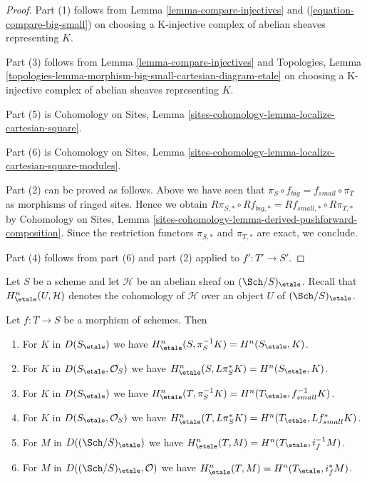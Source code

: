 \begin{proof}
Part (1) follows from
Lemma \ref{lemma-compare-injectives}
and (\ref{equation-compare-big-small})
on choosing a K-injective complex of abelian sheaves representing $K$.

\medskip\noindent
Part (3) follows from Lemma \ref{lemma-compare-injectives}
and Topologies, Lemma
\ref{topologies-lemma-morphism-big-small-cartesian-diagram-etale}
on choosing a K-injective complex of abelian sheaves representing $K$.

\medskip\noindent
Part (5) is Cohomology on Sites, Lemma
\ref{sites-cohomology-lemma-localize-cartesian-square}.

\medskip\noindent
Part (6) is Cohomology on Sites, Lemma
\ref{sites-cohomology-lemma-localize-cartesian-square-modules}.

\medskip\noindent
Part (2) can be proved as follows. Above we have seen
that $\pi_S \circ f_{big} = f_{small} \circ \pi_T$ as morphisms
of ringed sites. Hence we obtain
$R\pi_{S, *} \circ Rf_{big, *} = Rf_{small, *} \circ R\pi_{T, *}$
by Cohomology on Sites, Lemma
\ref{sites-cohomology-lemma-derived-pushforward-composition}.
Since the restriction functors $\pi_{S, *}$ and $\pi_{T, *}$
are exact, we conclude.

\medskip\noindent
Part (4) follows from part (6) and part (2) applied to $f' : T' \to S'$.
\end{proof}

\noindent
Let $S$ be a scheme and let $\mathcal{H}$ be an abelian sheaf on
$(\Sch/S)_\etale$. Recall that $H^n_\etale(U, \mathcal{H})$ denotes
the cohomology of $\mathcal{H}$ over an object $U$ of $(\Sch/S)_\etale$.

\begin{lemma}
\label{lemma-compare-cohomology}
Let $f : T \to S$ be a morphism of schemes. Then
\begin{enumerate}
\item For $K$ in $D(S_\etale)$ we have
$H^n_\etale(S, \pi_S^{-1}K) = H^n(S_\etale, K)$.
\item For $K$ in $D(S_\etale, \mathcal{O}_S)$ we have
$H^n_\etale(S, L\pi_S^*K) = H^n(S_\etale, K)$.
\item For $K$ in $D(S_\etale)$ we have
$H^n_\etale(T, \pi_S^{-1}K) = H^n(T_\etale, f_{small}^{-1}K)$.
\item For $K$ in $D(S_\etale, \mathcal{O}_S)$ we have
$H^n_\etale(T, L\pi_S^*K) = H^n(T_\etale, Lf_{small}^*K)$.
\item For $M$ in $D((\Sch/S)_\etale)$ we have
$H^n_\etale(T, M) = H^n(T_\etale, i_f^{-1}M)$.
\item For $M$ in $D((\Sch/S)_\etale, \mathcal{O})$ we have
$H^n_\etale(T, M) = H^n(T_\etale, i_f^*M)$.
\end{enumerate}
\end{lemma}

